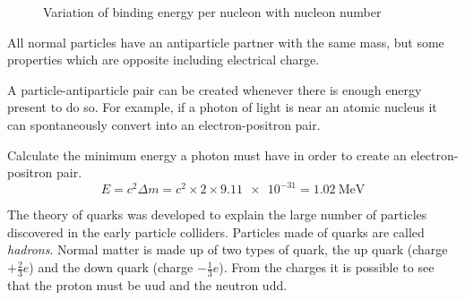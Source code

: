 \documentclass[main.tex]{subfiles}
\begin{document}
\begin{figure}[h]
  \begin{center}
  \end{center}
  \caption{Variation of binding energy per nucleon with nucleon number}
  \label{binding-energy}
\end{figure}


All normal particles have an antiparticle partner with the same mass, but some properties which are opposite including electrical charge.


A particle-antiparticle pair can be created whenever there is enough energy present to do so. For example, if a photon of light is near an atomic nucleus it can spontaneously convert into an electron-positron pair.

\begin{example}
  Calculate the minimum energy a photon must have in order to create an electron-positron pair.
  \answer
  \[ E = c^2 \Delta m = c^2 \times 2 \times\num{9.11e-31} = \SI{1.02}{\mega\electronvolt} \]
\end{example}


The theory of quarks was developed to explain the large number of particles discovered in the early particle colliders. Particles made of quarks are called \emph{hadrons}. Normal matter is made up of two types of quark, the up quark (charge $+\frac{2}{3}e$) and the down quark (charge $-\frac{1}{3}e$). From the charges it is possible to see that the proton must be uud and the neutron udd.
\end{document}
